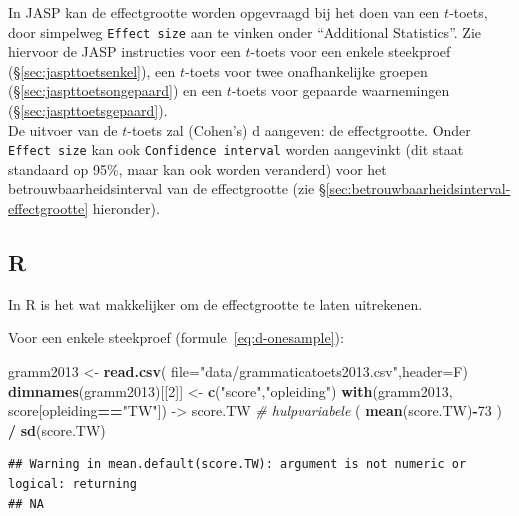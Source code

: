 \documentclass[
]{book}
\newenvironment{Shaded}{\begin{snugshade}}{\end{snugshade}}
\newcommand{\CommentTok}[1]{\textcolor[rgb]{0.56,0.35,0.01}{\textit{#1}}}
\newcommand{\DataTypeTok}[1]{\textcolor[rgb]{0.13,0.29,0.53}{#1}}
\newcommand{\DecValTok}[1]{\textcolor[rgb]{0.00,0.00,0.81}{#1}}
\newcommand{\KeywordTok}[1]{\textcolor[rgb]{0.13,0.29,0.53}{\textbf{#1}}}
\newcommand{\NormalTok}[1]{#1}
\newcommand{\OperatorTok}[1]{\textcolor[rgb]{0.81,0.36,0.00}{\textbf{#1}}}
\newcommand{\StringTok}[1]{\textcolor[rgb]{0.31,0.60,0.02}{#1}}
\begin{document}
In JASP kan de effectgrootte worden opgevraagd bij het doen van een \(t\)-toets, door simpelweg \texttt{Effect\ size} aan te vinken onder ``Additional Statistics''. Zie hiervoor de JASP instructies voor een \(t\)-toets voor een enkele steekproef (§\ref{sec:jaspttoetsenkel}), een \(t\)-toets voor twee onafhankelijke groepen (§\ref{sec:jaspttoetsongepaard}) en een \(t\)-toets voor gepaarde waarnemingen (§\ref{sec:jaspttoetsgepaard}).\\
De uitvoer van de \(t\)-toets zal (Cohen's) d aangeven: de effectgrootte. Onder \texttt{Effect\ size} kan ook \texttt{Confidence\ interval} worden aangevinkt (dit staat standaard op 95\%, maar kan ook worden veranderd) voor het betrouwbaarheidsinterval van de effectgrootte (zie §\ref{sec:betrouwbaarheidsinterval-effectgrootte} hieronder).

\hypertarget{r-14}{%
\subsection{R}\label{r-14}}

In R is het wat makkelijker om de effectgrootte te laten uitrekenen.

Voor een enkele steekproef
(formule~\eqref{eq:d-onesample}):\\

\begin{Shaded}
\begin{Highlighting}[]
\NormalTok{gramm2013 \textless{}{-}}\StringTok{ }\KeywordTok{read.csv}\NormalTok{( }\DataTypeTok{file=}\StringTok{"data/grammaticatoets2013.csv"}\NormalTok{,}\DataTypeTok{header=}\NormalTok{F)}
\KeywordTok{dimnames}\NormalTok{(gramm2013)[[}\DecValTok{2}\NormalTok{]] \textless{}{-}}\StringTok{ }\KeywordTok{c}\NormalTok{(}\StringTok{"score"}\NormalTok{,}\StringTok{"opleiding"}\NormalTok{)}
\KeywordTok{with}\NormalTok{(gramm2013, score[opleiding}\OperatorTok{==}\StringTok{"TW"}\NormalTok{]) {-}\textgreater{}}\StringTok{ }\NormalTok{score.TW }\CommentTok{\# hulpvariabele}
\NormalTok{( }\KeywordTok{mean}\NormalTok{(score.TW)}\OperatorTok{{-}}\DecValTok{73}\NormalTok{ ) }\OperatorTok{/}\StringTok{ }\KeywordTok{sd}\NormalTok{(score.TW) }
\end{Highlighting}
\end{Shaded}

\begin{verbatim}
## Warning in mean.default(score.TW): argument is not numeric or logical: returning
## NA
\end{verbatim}
\end{document}
